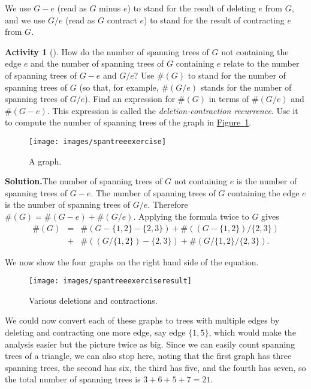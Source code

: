 \documentclass[10pt,]{book}
\theoremstyle{plain}
\theoremstyle{definition}
\newtheorem{activity}[project]{Activity}
\numberwithin{equation}{chapter}
\newcommand{\amp}{&}
\begin{document}
%
\par
We use \(G-e\) (read as \(G\) minus \(e\)) to stand for the result of deleting \(e\) from \(G\), and we use \(G/e\) (read as \(G\) contract \(e\)) to stand for the result of contracting \(e\) from \(G\).%
\begin{activity}[]\label{activity-109}
How do the number of spanning trees of \(G\) not containing the edge \(e\) and the number of spanning trees of \(G\) containing \(e\) relate to the number of spanning trees of \(G-e\) and \(G/e\)? Use \(\#(G)\) to stand for the number of spanning trees of \(G\) (so that, for example, \(\#(G/e)\) stands for the number of spanning trees of \(G/e\)). Find an expression for \(\#(G)\) in terms of \(\#(G/e)\) and \(\#(G-e)\). This expression is called the \emph{deletion-contraction recurrence}. Use it to compute the number of spanning trees of the graph in \hyperref[spantreeexercise]{Figure~\ref{spantreeexercise}}.%
\begin{figure}
\centering
\texttt{[image: images/spantreeexercise]}
\caption{A graph.\label{spantreeexercise}}
\end{figure}
\par\medskip\noindent%
\textbf{Solution.}\quad The number of spanning trees of \(G\) not containing \(e\) is the number of spanning trees of \(G-e\). The number of spanning trees of \(G\) containing the edge \(e\) is the number of spanning trees of \(G/e\). Therefore \(\#(G) =\#(G-e)
+\#(G/e)\). Applying the formula twice to \(G\) gives%
\begin{align*}
\#(G)
\amp =\amp \#(G-\{1,2\}-\{2,3\}) + \#((G-\{1,2\})/\{2,3\})\\
\amp +\amp
\#((G/\{1,2\})-\{2,3\}) +
\#(G/\{1,2\}/\{2,3\}).
\end{align*}
%
\par
We now show the four graphs on the right hand side of the equation.%
\begin{figure}
\centering
\texttt{[image: images/spantreeexerciseresult]}
\caption{Various deletions and contractions.\label{spantreeexerciseresult}}
\end{figure}
We could now convert each of these graphs to trees with multiple edges by deleting and contracting one more edge, say edge \(\{1,5\}\), which would make the analysis easier but the picture twice as big. Since we can easily count spanning trees of a triangle, we can also stop here, noting that the first graph has three spanning trees, the second has six, the third has five, and the fourth has seven, so the total number of spanning trees is \(3+6+5+7=21\).%
\end{activity}
\typeout{************************************************}
\typeout{************************************************}
\end{document}
